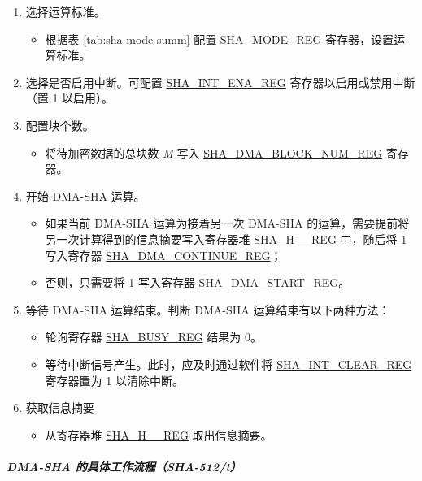 \documentclass[main\_\_CN.tex]{subfiles}
\begin{document}
\begin{enumerate}
    \item 选择运算标准。
    \begin{itemize}
        \item 根据表 \ref{tab:sha-mode-summ} 配置 \hyperref[regdesc:SHAMODEREG]{SHA\_MODE\_REG} 寄存器，设置运算标准。
    \end{itemize}
    \item 选择是否启用中断。可配置 \hyperref[regdesc:SHAINTENAREG]{SHA\_INT\_ENA\_REG} 寄存器以启用或禁用中断（置 1 以启用）。
    \item 配置块个数。
    \begin{itemize}
        \item  将待加密数据的总块数 {\it{M}} 写入  \hyperref[regdesc:SHADMABLOCKNUMREG]{SHA\_DMA\_BLOCK\_NUM\_REG} 寄存器。
    \end{itemize}
    \item 开始 DMA-SHA 运算。
        \begin{itemize}
            \item 如果当前 DMA-SHA 运算为接着另一次 DMA-SHA 的运算，需要提前将另一次计算得到的信息摘要写入寄存器堆 \hyperref[regdesc:SHAHNREG]{SHA\_H\_\_REG} 中，随后将 1 写入寄存器 \hyperref[regdesc:SHADMACONTINUEREG]{SHA\_DMA\_CONTINUE\_REG}；
            \item 否则，只需要将 1 写入寄存器 \hyperref[regdesc:SHADMASTARTREG]{SHA\_DMA\_START\_REG}。
        \end{itemize}
    \item 等待 DMA-SHA 运算结束。判断 DMA-SHA 运算结束有以下两种方法：
        \begin{itemize}
            \item 轮询寄存器 \hyperref[regdesc:SHABUSYREG]{SHA\_BUSY\_REG} 结果为 0。
            \item 等待中断信号产生。此时，应及时通过软件将 \hyperref[regdesc:SHAINTCLEARREG]{SHA\_INT\_CLEAR\_REG} 寄存器置为 1 以清除中断。
        \end{itemize}

    \item 获取信息摘要
    \begin{itemize}
        \item 从寄存器堆 \hyperref[regdesc:SHAHNREG]{SHA\_H\_\_REG} 取出信息摘要。
    \end{itemize}
\end{enumerate}

\subparagraph{DMA-SHA 的具体工作流程（SHA-512/{\it{t}}）}
\end{document}
